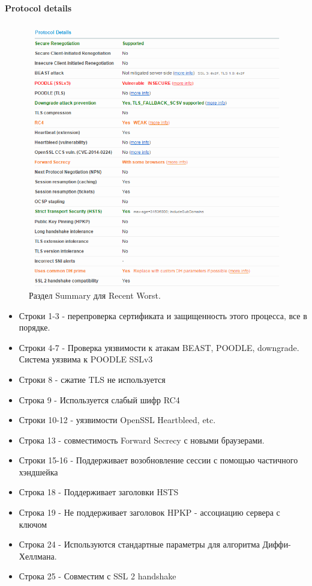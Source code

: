 \documentclass[a4paper, 14pt]{article}				%
\begin{document}
\paragraph{Protocol details\\}
\begin{figure}[h!]
\centering
\includegraphics[width=\textwidth]{rsrc/lab7_fw_prot}
\caption{Раздел Summary для Recent Worst.}
\end{figure}

\begin{itemize}
\item{Строки 1-3 - перепроверка сертификата и защищенность этого процесса, все в порядке.}
\item{Строки 4-7 - Проверка уязвимости к атакам BEAST, POODLE, downgrade. Система уязвима к POODLE SSLv3}
\item{Строки 8 - сжатие TLS не используется}
\item{Строка 9 - Используется слабый шифр RC4}
\item{Строки 10-12 - уязвимости OpenSSL Heartbleed, etc.}
\item{Строка 13 - совместимость Forward Secrecy с новыми браузерами.}
\item{Строки 15-16 - Поддерживает возобновление сессии с помощью частичного хэндшейка}
\item{Строка 18 - Поддерживает заголовки HSTS}
\item{Строка 19 - Не поддерживает заголовок HPKP - ассоциацию сервера с ключом}
\item{Строка 24 - Используются стандартные параметры для алгоритма Диффи-Хеллмана.}
\item{Строка 25 - Совместим с SSL 2 handshake}
\end{itemize}
\end{document}
